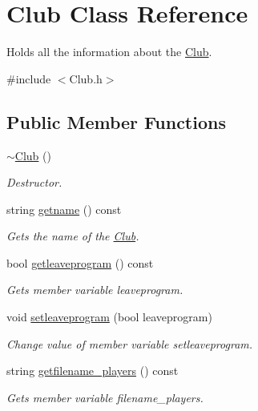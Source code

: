 \hypertarget{class_club}{}\section{Club Class Reference}
\label{class_club}


Holds all the information about the \hyperlink{class_club}{Club}.  




{\ttfamily \#include $<$Club.\+h$>$}

\subsection*{Public Member Functions}
\begin{DoxyCompactItemize}
\item 
\hyperlink{class_club_a1c2993e141cfa6468284274359cc7de5}{$\sim$\+Club} ()
\begin{DoxyCompactList}\small\item\em Destructor. \end{DoxyCompactList}\item 
string \hyperlink{class_club_aca473ab431cc852ad0f99479aace788c}{getname} () const
\begin{DoxyCompactList}\small\item\em Gets the name of the \hyperlink{class_club}{Club}. \end{DoxyCompactList}\item 
bool \hyperlink{class_club_a08eeadedcdbf4cfd5eaada3066b668dd}{getleaveprogram} () const
\begin{DoxyCompactList}\small\item\em Gets member variable leaveprogram. \end{DoxyCompactList}\item 
void \hyperlink{class_club_a797110a5f4b779fec91a6fecbc0e3dda}{setleaveprogram} (bool leaveprogram)
\begin{DoxyCompactList}\small\item\em Change value of member variable setleaveprogram. \end{DoxyCompactList}\item 
string \hyperlink{class_club_a8c96af96a3b46adf1d3d46694452b422}{getfilename\+\_\+players} () const
\begin{DoxyCompactList}\small\item\em Gets member variable filename\+\_\+players. \end{DoxyCompactList}\item 

\end{DoxyCompactItemize}
